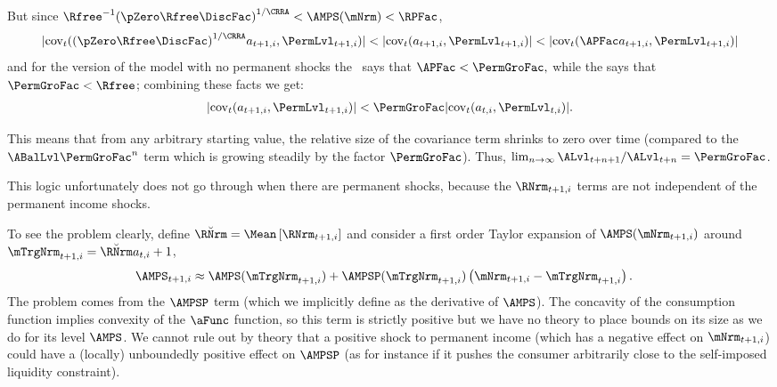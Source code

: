 \documentclass[\econtexRoot/Endo]{subfiles}
\begin{document}
But since ${\Rfree}^{-1}{(\pZero  \Rfree\DiscFac)}^{1/\CRRA} < \AMPS(\mNrm) < \RPFac $,
\begin{equation}
  |\mbox{cov}_{t}({(\pZero  \Rfree\DiscFac)}^{1/\CRRA}a_{t+1,i},\PermLvl_{t+1,i})| <
  |\mbox{cov}_{t}(a_{t+1,i},\PermLvl_{t+1,i})| <
  |\mbox{cov}_{t}({\APFac}a_{t+1,i},\PermLvl_{t+1,i})| \nonumber
\end{equation}
and for the version of the model with no permanent shocks the \GICMod~says that ${\APFac} < \PermGroFac, $ while the {\FHWC} says that $\PermGroFac < \Rfree$; combining these facts we get:
\begin{equation}\begin{gathered}\begin{aligned}
  |\mbox{cov}_{t}(a_{t+1,i},\PermLvl_{t+1,i})| < \PermGroFac
  |\mbox{cov}_{t}(a_{t,i},\PermLvl_{t,i})|. \nonumber
\end{aligned}\end{gathered}\end{equation}

This means that from any arbitrary starting value, the relative size of the covariance term shrinks to zero over time (compared to the $\ABalLvl \PermGroFac^{n}$ term which is growing steadily by the factor $\PermGroFac$).  Thus, $\lim_{n \rightarrow \infty} \ALvl_{t+n+1}/\ALvl_{t+n} = \PermGroFac$.

This logic unfortunately does not go through when there are permanent shocks, because the $\RNrm _{t+1,i}$ terms are not independent of the permanent income shocks.

To see the problem clearly, define $\breve{\RNrm }=\Mean\left[\RNrm _{t+1,i}\right]$ and consider a first order Taylor expansion of $\AMPS(\mNrm_{t+1,i})$ around $\mTrgNrm_{t+1,i}=\breve{\RNrm } a_{t,i}+1$,
\begin{align*}
  \AMPS_{t+1,i} & \approx 
  \AMPS(\mTrgNrm_{t+1,i})+\AMPSP(\mTrgNrm_{t+1,i})\left(\mNrm_{t+1,i}-\mTrgNrm_{t+1,i}\right)
 \nonumber.
\end{align*}
The problem comes from the $\AMPSP$ term (which we implicitly define as the derivative of $\AMPS$).  The concavity of the consumption function implies convexity of the $\aFunc$ function, so this term is strictly positive but we have no theory to place bounds on its size as we do for its level $\AMPS$.  We cannot rule out by theory that a positive shock to permanent income (which has a negative effect on $\mNrm_{t+1,i}$) could have a (locally) unboundedly positive effect on $\AMPSP$ (as for instance if it pushes the consumer arbitrarily close to the self-imposed liquidity constraint).
\end{document}
